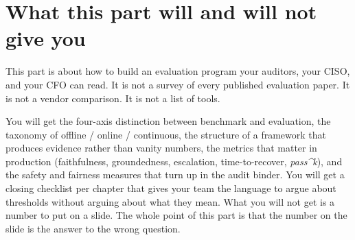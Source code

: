 \begin{Figure}
\end{Figure}

\section{What this part will and will not give you}

This part is about how to build an evaluation program your auditors, your CISO, and your CFO can read. It is not a survey of every published evaluation paper. It is not a vendor comparison. It is not a list of tools.

You will get the four-axis distinction between benchmark and evaluation, the taxonomy of offline / online / continuous, the structure of a framework that produces evidence rather than vanity numbers, the metrics that matter in production (faithfulness, groundedness, escalation, time-to-recover, \textit{pass\textasciicircum k}), and the safety and fairness measures that turn up in the audit binder. You will get a closing checklist per chapter that gives your team the language to argue about thresholds without arguing about what they mean. What you will not get is a number to put on a slide. The whole point of this part is that the number on the slide is the answer to the wrong question.

